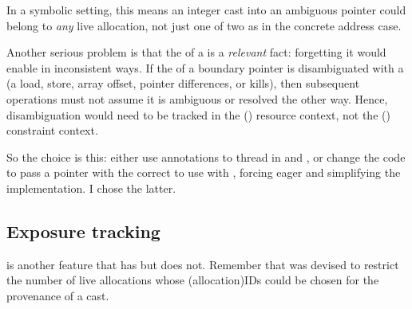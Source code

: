 In a symbolic setting, this means an integer cast into an ambiguous
 pointer could belong to \emph{any} live allocation, not just one
of two as in the concrete address case.

Another serious problem is that the  of a  is a \emph{relevant} fact:
forgetting it would enable  in inconsistent ways.
If the  of a boundary pointer is disambiguated with a
 (a load, store, array offset, pointer differences, or
kills), then subsequent operations must not assume it is ambiguous or resolved
the other way. Hence, disambiguation would need to be tracked in the
() resource context, not the () constraint
context.

So the choice is this: either use annotations to thread   in  and , or change
the code to pass a pointer with the correct  to use with
, forcing eager  and simplifying the
implementation. I chose the latter.

\subsection{Exposure tracking}

 is another feature that  has but
 does not. Remember that  was devised to restrict
the number of live allocations whose \kl(allocation){IDs} could be chosen
for the provenance of a  cast.

